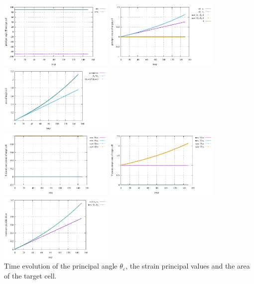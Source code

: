 \begin{center}
\includegraphics[width=5.5cm]{python_codes/fieldstone_89/results/vertical/principal_angle.pdf}
\includegraphics[width=5.5cm]{python_codes/fieldstone_89/results/vertical/principal_strains.pdf}
\includegraphics[width=5.5cm]{python_codes/fieldstone_89/results/vertical/area.pdf}\\
\includegraphics[width=5.5cm]{python_codes/fieldstone_89/results/vertical/R.pdf}
\includegraphics[width=5.5cm]{python_codes/fieldstone_89/results/vertical/V.pdf}
\includegraphics[width=5.5cm]{python_codes/fieldstone_89/results/vertical/maximum_shear.pdf}\\
{\captionfont Time evolution of the principal angle $\theta_\varepsilon$, 
the strain principal values and the area of the target cell.}
\end{center}





